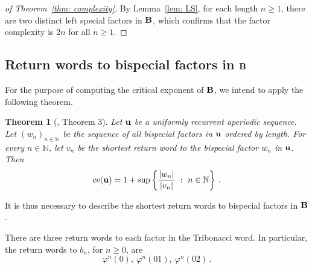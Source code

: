 \documentclass[
final
]{dmtcs-episciences}
\DeclareMathOperator{\ce}{ce}
\theoremstyle{plain}
\newtheorem{theorem}{Theorem}
\theoremstyle{definition}
\theoremstyle{remark}
\begin{document}
\begin{proof}[of Theorem~\ref{thm: complexity}]
By Lemma~\ref{lem: LS}, for each length $n\geq 1$, there are two distinct left special factors in $\bf B$, which confirms that the factor complexity is $2n$ for all $n\geq 1$.
\end{proof}

\subsection{Return words to bispecial factors in $\bf B$}
For the purpose of computing the critical exponent of $\bf B$, we intend to apply the following theorem. 

\begin{theorem}[\cite{Dolce&Dvorakova&Pelantova:2023}, Theorem 3]\label{thm:FormulaForE}
Let $\bf u$ be a uniformly recurrent aperiodic sequence.
Let $(w_n)_{n\in\mathbb N}$ be the sequence of all bispecial factors in $\bf u$ ordered by length.
For every $n \in \mathbb N$, let $v_n$ be the shortest return word to the bispecial factor $w_n$ in $\bf u$.
Then
$$
\ce({\bf u}) = 1 + \sup\left\{\frac{|w_n|}{|v_n|}\ : \ n\in \mathbb N \right\}\,.
$$
\end{theorem}

It is thus necessary to describe the shortest return words to bispecial factors in $\bf B$.

There are three return words to each factor in the Tribonacci word. In particular, the return words to $b_n$, for $n\geq 0$, are 
$$\varphi^n(0),\ \varphi^n(01),\ \varphi^n(02)\,.$$
\end{document}

